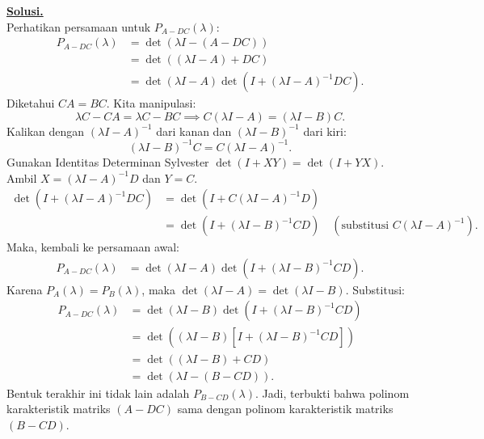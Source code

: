 \documentclass[12pt,twoside]{article}
\newenvironment{solution}
{
	\par\noindent\textbf{\underline{Solusi.}}\\
}
{
	\par
}
\begin{document}
\begin{enumerate}
\begin{solution}
          Perhatikan persamaan untuk $P_{A-DC}(\lambda)$:
          \begin{align*}
            P_{A-DC}(\lambda) & = \det(\lambda I - (A - DC))                             \\
                              & = \det((\lambda I - A) + DC)                             \\
                              & = \det(\lambda I - A) \det(I + (\lambda I - A)^{-1} DC).
          \end{align*}
          Diketahui $CA = BC$. Kita manipulasi:
          \[ \lambda C - CA = \lambda C - BC \implies C(\lambda I - A) = (\lambda I - B)C. \]
          Kalikan dengan $(\lambda I - A)^{-1}$ dari kanan dan $(\lambda I - B)^{-1}$ dari kiri:
          \[ (\lambda I - B)^{-1} C = C (\lambda I - A)^{-1}. \]
          Gunakan Identitas Determinan Sylvester $\det(I + XY) = \det(I + YX)$.
          Ambil $X = (\lambda I - A)^{-1} D$ dan $Y = C$.
          \begin{align*}
            \det(I + (\lambda I - A)^{-1} D C) & = \det(I + C (\lambda I - A)^{-1} D)                                                   \\
                                               & = \det(I + (\lambda I - B)^{-1} C D) \quad (\text{substitusi } C(\lambda I - A)^{-1}).
          \end{align*}
          Maka, kembali ke persamaan awal:
          \begin{align*}
            P_{A-DC}(\lambda) & = \det(\lambda I - A) \det(I + (\lambda I - B)^{-1} C D).
          \end{align*}
          Karena $P_A(\lambda) = P_B(\lambda)$, maka $\det(\lambda I - A) = \det(\lambda I - B)$. Substitusi:
          \begin{align*}
            P_{A-DC}(\lambda) & = \det(\lambda I - B) \det(I + (\lambda I - B)^{-1} C D) \\
                              & = \det((\lambda I - B) [I + (\lambda I - B)^{-1} C D])   \\
                              & = \det((\lambda I - B) + C D)                            \\
                              & = \det(\lambda I - (B - CD)).
          \end{align*}
          Bentuk terakhir ini tidak lain adalah $P_{B-CD}(\lambda)$.
          Jadi, terbukti bahwa polinom karakteristik matriks $(A - DC)$ sama dengan polinom karakteristik matriks $(B - CD)$.
        \end{solution}
\end{enumerate}
\end{document}
